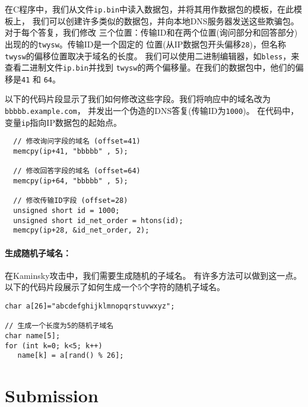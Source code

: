 在C程序中，我们从文件\texttt{ip.bin}中读入数据包，并将其用作数据包的模板，在此模板上，
我们可以创建许多类似的数据包，并向本地DNS服务器发送这些欺骗包。对于每个答复，我们修改
三个位置：传输ID和在两个位置(询问部分和回答部分)出现的的\texttt{twysw}。传输ID是一个固定的
位置(从IP数据包开头偏移\texttt{28})，但名称\texttt{twysw}的偏移位置取决于域名的长度。
我们可以使用二进制编辑器，如\texttt{bless}，来查看二进制文件\texttt{ip.bin}并找到
\texttt{twysw}的两个偏移量。在我们的数据包中，他们的偏移是\texttt{41} 和 \texttt{64}。


以下的代码片段显示了我们如何修改这些字段。我们将响应中的域名改为\texttt{bbbbb.example.com}，
并发出一个伪造的DNS答复(传输ID为\texttt{1000})。
在代码中，变量\texttt{ip}指向IP数据包的起始点。
 

\begin{lstlisting}
  // 修改询问字段的域名 (offset=41)
  memcpy(ip+41, "bbbbb" , 5);

  // 修改回答字段的域名 (offset=64)
  memcpy(ip+64, "bbbbb" , 5);

  // 修改传输ID字段 (offset=28)
  unsigned short id = 1000;
  unsigned short id_net_order = htons(id);
  memcpy(ip+28, &id_net_order, 2);
\end{lstlisting}



\paragraph{生成随机子域名：} 在Kaminsky攻击中，我们需要生成随机的子域名。
有许多方法可以做到这一点。以下的代码片段展示了如何生成一个5个字符的随机子域名。


\begin{lstlisting}
char a[26]="abcdefghijklmnopqrstuvwxyz";

// 生成一个长度为5的随机子域名
char name[5];
for (int k=0; k<5; k++)  
   name[k] = a[rand() % 26];
\end{lstlisting}
 



\section{Submission}

\seedsubmission


\thispagestyle{empty}

\def\baselinestretch{1}








